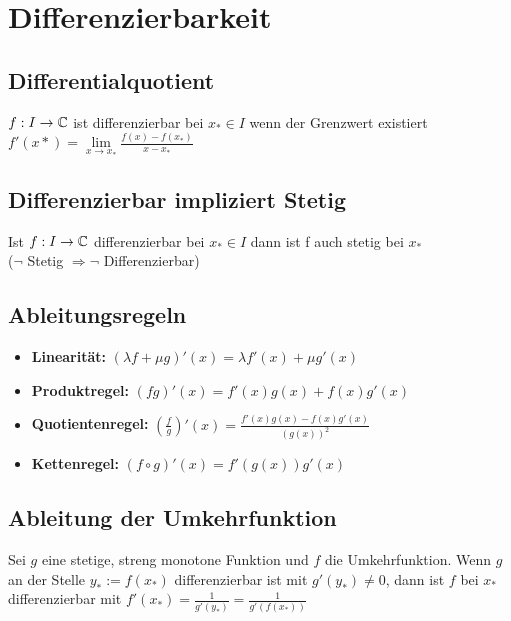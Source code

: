\documentclass[german]{latex4ei/latex4ei_sheet}
\begin{document}
\section{Differenzierbarkeit}

\begin{sectionbox}
	\subsection{Differentialquotient}
	$f: I \rightarrow \mathbb C$ ist differenzierbar bei $x_* \in I $ wenn der Grenzwert existiert \\
	$f'(x*)= \lim \limits_{x \to x_*} \frac{f(x)-f(x_*)}{x-x_*}$

\end{sectionbox}

\begin{sectionbox}
	\subsection{Differenzierbar impliziert Stetig}
	Ist $f: I \rightarrow \mathbb C$ differenzierbar bei $ x_* \in I$ dann ist f auch stetig bei $x_*$ \\
	($\neg$ Stetig $\Rightarrow \neg$ Differenzierbar)

\end{sectionbox}

\begin{sectionbox}
	\subsection{Ableitungsregeln}
	\begin{itemize}
		\item \textbf{Linearität: } $(\lambda f + \mu g)'(x)=\lambda f'(x) + \mu g'(x)$
		\item \textbf{Produktregel: } $(fg)'(x)=f'(x)g(x)+f(x)g'(x)$
		\item \textbf{Quotientenregel: } $(\frac{f}{g})'(x)= \frac{f'(x)g(x)-f(x)g'(x)}{(g(x))^2}$
		\item \textbf{Kettenregel: } $(f \circ g)'(x)=f'(g(x))g'(x)$
	\end{itemize}

\end{sectionbox}

\begin{sectionbox}
	\subsection{Ableitung der Umkehrfunktion}
	Sei $g$ eine stetige, streng monotone Funktion und $f$ die Umkehrfunktion. Wenn $g$ an der Stelle $y_* := f(x_*)$ differenzierbar ist mit $g'(y_*) \neq 0$, dann ist $f$ bei $x_*$ differenzierbar mit $f'(x_*)=\frac{1}{g'(y_*)}=\frac{1}{g'(f(x_*))}$


\end{sectionbox}
\end{document}

